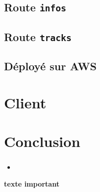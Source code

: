 \documentclass{beamer}
\begin{document}
\subsection{Route \texttt{infos}}
\subsection{Route \texttt{tracks}}
\subsection{Déployé sur AWS}

\section{Client}

\section{Conclusion}
\begin{frame}
	\frametitle{\secname}
	\begin{itemize}
		\item 
	\end{itemize}
	\Large\textbf{texte important}
\end{frame}
\end{document}
